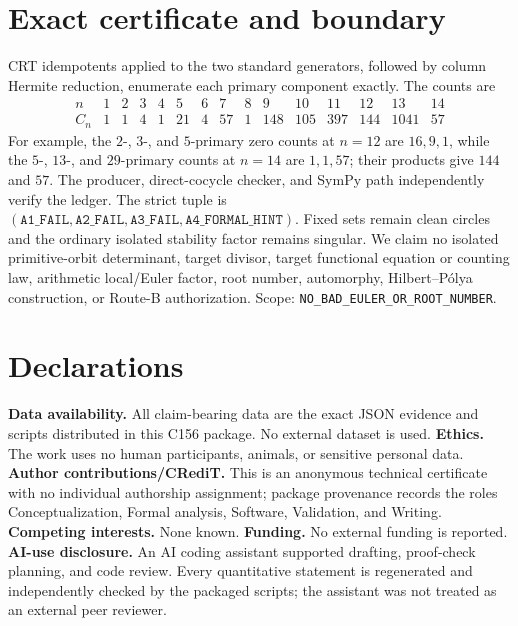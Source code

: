 \documentclass[10pt]{article}
\begin{document}
\section{Exact certificate and boundary}
CRT idempotents applied to the two standard generators, followed by column
Hermite reduction, enumerate each primary component exactly.  The counts are
\[
\begin{array}{c|rrrrrrrrrrrrrr}
n&1&2&3&4&5&6&7&8&9&10&11&12&13&14\\ \hline
C_n&1&1&4&1&21&4&57&1&148&105&397&144&1041&57
\end{array}
\]
For example, the $2$-, $3$-, and $5$-primary zero counts at $n=12$ are
$16,9,1$, while the $5$-, $13$-, and $29$-primary counts at $n=14$ are
$1,1,57$; their products give $144$ and $57$.
The producer, direct-cocycle checker, and SymPy path independently verify the
ledger.  The strict tuple is $(\texttt{A1\_FAIL},\texttt{A2\_FAIL},
\texttt{A3\_FAIL},\texttt{A4\_FORMAL\_HINT})$.  Fixed sets remain clean
circles and the ordinary isolated stability factor remains singular.  We
claim no isolated primitive-orbit determinant, target divisor, target
functional equation or counting law, arithmetic local/Euler factor, root
number, automorphy, Hilbert--P\'olya construction, or Route-B authorization.
Scope: \texttt{NO\_BAD\_EULER\_OR\_ROOT\_NUMBER}.

\section*{Declarations}
\textbf{Data availability.}  All claim-bearing data are the exact JSON
evidence and scripts distributed in this C156 package.  No external dataset is
used.  \textbf{Ethics.}  The work uses no human participants, animals, or
sensitive personal data.  \textbf{Author contributions/CRediT.}  This is an
anonymous technical certificate with no individual authorship assignment;
package provenance records the roles Conceptualization, Formal analysis,
Software, Validation, and Writing.  \textbf{Competing interests.}  None known.
\textbf{Funding.}  No external funding is reported.  \textbf{AI-use
disclosure.}  An AI coding assistant supported drafting, proof-check planning,
and code review.  Every quantitative statement is regenerated and independently
checked by the packaged scripts; the assistant was not treated as an external
peer reviewer.
\end{document}
